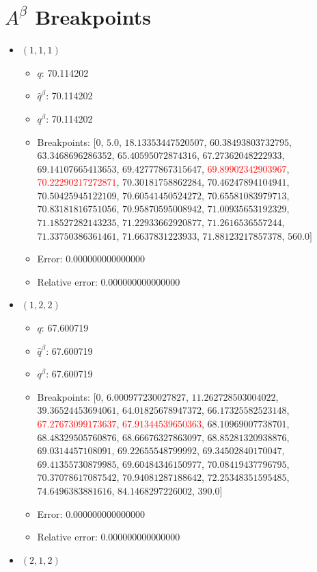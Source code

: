 \documentclass{article}%
\begin{document}
\section{$A^\beta$ Breakpoints}%
\thispagestyle{plain}%
\begin{itemize}%
	\item $(1, 1, 1)$%
	\begin{itemize}%
		\item $q$: 70.114202%
		\item $\hat{q}^\beta$: 70.114202%
		\item $q^\beta$: 70.114202%
		\item Breakpoints: $[$$0$, $5.0$, $18.13353447520507$, $60.38493803732795$, $63.3468696286352$, $65.40595072874316$, $67.27362048222933$, $69.14107665413653$, $69.42777867315647$, \textcolor{red}{$69.89902342903967$}, \textcolor{red}{$70.22290217272871$}, $70.30181758862284$, $70.46247894104941$, $70.50425945122109$, $70.60541450524272$, $70.65581083979713$, $70.83181816751056$, $70.95870595008942$, $71.00935653192329$, $71.18527282143235$, $71.22933662920877$, $71.2616536557244$, $71.33750386361461$, $71.6637831223933$, $71.88123217857378$, $560.0$$]$%
		\item Error: 0.000000000000000%
		\item Relative error: 0.000000000000000%
	\end{itemize}%
	\item $(1, 2, 2)$%
	\begin{itemize}%
		\item $q$: 67.600719%
		\item $\hat{q}^\beta$: 67.600719%
		\item $q^\beta$: 67.600719%
		\item Breakpoints: $[$$0$, $6.000977230027827$, $11.262728503004022$, $39.36524453694061$, $64.01825678947372$, $66.17325582523148$, \textcolor{red}{$67.27673099173637$}, \textcolor{red}{$67.91344539650363$}, $68.10969007738701$, $68.48329505760876$, $68.66676327863097$, $68.85281320938876$, $69.0314457108091$, $69.22655548799992$, $69.34502840170047$, $69.41355730879985$, $69.60484346150977$, $70.08419437796795$, $70.37078617087542$, $70.94081287188642$, $72.25348351595485$, $74.6496383881616$, $84.1468297226002$, $390.0$$]$%
		\item Error: 0.000000000000000%
		\item Relative error: 0.000000000000000%
	\end{itemize}%
	\item $(2, 1, 2)$%
	\begin{itemize}%

\end{itemize}
\end{itemize}
\end{document}

